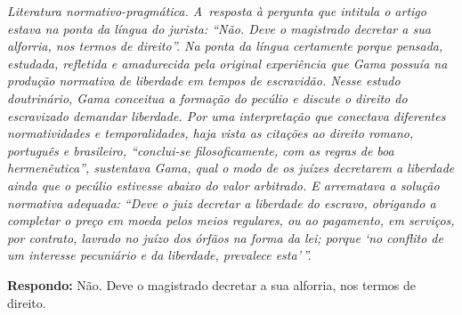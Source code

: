 
\begin{resumo}
\emph{Literatura normativo-pragmática. A~resposta à pergunta que
intitula o artigo estava na ponta da língua do jurista: ``Não. Deve o
magistrado decretar a sua alforria, nos termos de direito''. Na ponta
da língua certamente porque pensada, estudada, refletida e amadurecida pela
original experiência que Gama possuía na produção normativa de liberdade
em tempos de escravidão. Nesse estudo doutrinário, Gama conceitua a
formação do pecúlio e discute o direito do escravizado demandar
liberdade. Por uma interpretação que conectava diferentes normatividades
e temporalidades, haja vista as citações ao direito romano, português e
brasileiro, ``conclui-se filosoficamente, com as regras de boa
hermenêutica'', sustentava Gama, qual o modo de os juízes decretarem a
liberdade ainda que o pecúlio estivesse abaixo do valor arbitrado. E
arrematava a solução normativa adequada: ``Deve o juiz decretar a
liberdade do escravo, obrigando a completar o preço em moeda pelos meios
regulares, ou ao pagamento, em serviços, por contrato, lavrado no juízo
dos órfãos na forma da lei; porque `no conflito de um interesse
pecuniário e da liberdade, prevalece esta'\,''. }
\end{resumo}

\pagebreak

\textbf{Respondo:} Não. Deve o magistrado decretar a sua alforria, nos termos de direito.

\asterisc

